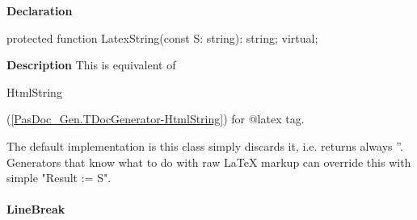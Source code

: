 \documentclass{report}
\newif\ifpdf
\begin{document}
\label{PasDoc_Gen.TDocGenerator-LatexString}
\begin{list}{}{
\setlength{\itemindent}{0cm}
\setlength{\listparindent}{0cm}
\setlength{\leftmargin}{\evensidemargin}
\addtolength{\leftmargin}{\tmplength}
\settowidth{\labelsep}{X}
\addtolength{\leftmargin}{\labelsep}
\setlength{\labelwidth}{\tmplength}
}
\item[\textbf{Declaration}\hfill]
\ifpdf
\begin{flushleft}
\fi
\begin{ttfamily}
protected function LatexString(const S: string): string; virtual;\end{ttfamily}

\ifpdf
\end{flushleft}
\fi

\par
\item[\textbf{Description}]
This is equivalent of \begin{ttfamily}HtmlString\end{ttfamily}(\ref{PasDoc_Gen.TDocGenerator-HtmlString}) for @latex tag.

The default implementation is this class simply discards it, i.e. returns always ''. Generators that know what to do with raw LaTeX markup can override this with simple "Result := S".

\end{list}
\paragraph*{LineBreak}\hspace*{\fill}
\end{document}
